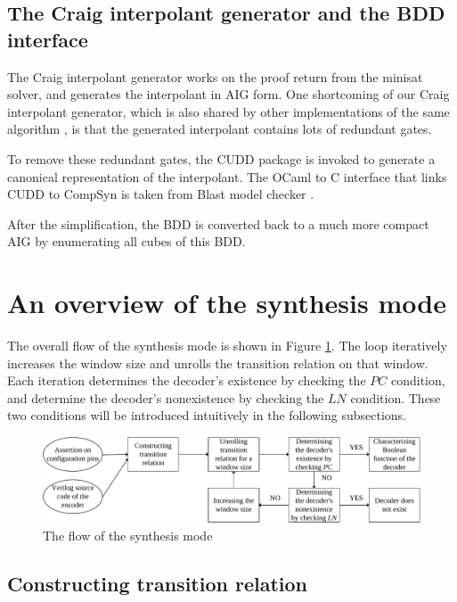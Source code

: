 \documentclass[runningheads,a4paper]{llncs}
\begin{document}
\subsection{The Craig interpolant generator and the BDD interface}

The Craig interpolant generator works on the proof return from the minisat solver,
and generates the interpolant in AIG form.
One shortcoming of our Craig interpolant generator,
which is also shared by other implementations of the same algorithm \cite{interp_McMillan},
is that the generated interpolant contains lots of redundant gates.

To remove these redundant gates,
the CUDD package is invoked to generate a canonical representation of the interpolant.
The OCaml to C interface that links CUDD to CompSyn is taken from Blast model checker \cite{blast}.

After the simplification,
the BDD is converted back to a much more compact AIG by enumerating all cubes of this BDD.

\section{An overview of the synthesis mode}\label{sec_syn}

The overall flow of the synthesis mode is shown in Figure \ref{fig_halting}.
The loop iteratively increases the window size and unrolls the transition relation on that window.
Each iteration determines the decoder's existence by checking the $PC$ condition,
and determine the decoder's nonexistence by checking the $LN$ condition.
These two conditions will be introduced intuitively in the following subsections.

\begin{figure}[t]
\centering
\includegraphics[width=\textwidth]{halting}
\caption{The flow of the synthesis mode}
\label{fig_halting}
\end{figure}

\subsection{Constructing transition relation}
\end{document}
